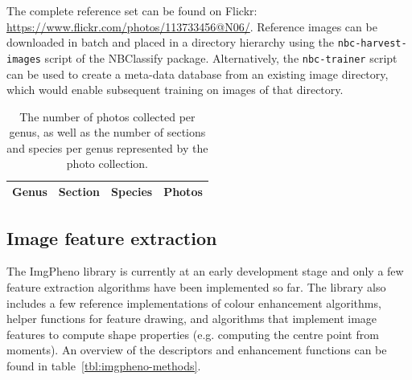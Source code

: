 \documentclass[twocolumn]{bmcart}
\begin{document}
The complete reference set can be found on Flickr: \url{https://www.flickr.com/photos/113733456@N06/}. Reference images can be downloaded in batch and placed in a directory hierarchy using the \verb/nbc-harvest-images/ script of the NBClassify package. Alternatively, the \verb/nbc-trainer/ script can be used to create a meta-data database from an existing image directory, which would enable subsequent training on images of that directory.

\begin{table}[h]\footnotesize
    \caption{The number of photos collected per genus, as well as the number of sections and species per genus represented by the photo collection.}
    \begin{center}
    \begin{tabular}{llll}
    \toprule
    \textbf{Genus} & \textbf{Section} & \textbf{Species} & \textbf{Photos} \\
    \midrule
    
    \bottomrule
    \end{tabular}
    \end{center}
    \label{tbl:photo-counts}
\end{table}

\subsection{Image feature extraction}

The ImgPheno library is currently at an early development stage and only a few feature extraction algorithms have been implemented so far. The library also includes a few reference implementations of colour enhancement algorithms, helper functions for feature drawing, and algorithms that implement image features to compute shape properties (e.g. computing the centre point from moments). An overview of the descriptors and enhancement functions can be found in table~\ref{tbl:imgpheno-methods}.
\end{document}
